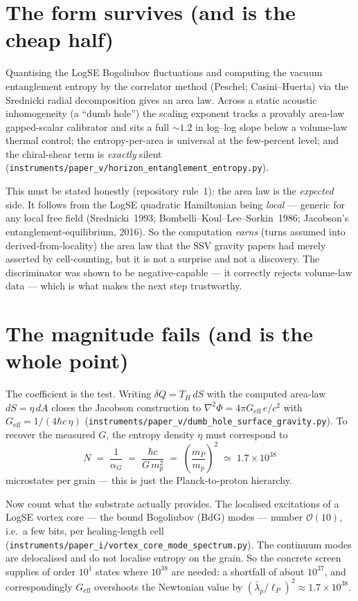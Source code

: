 \documentclass[11pt]{article}
\begin{document}
\section{The form survives (and is the cheap half)}

Quantising the LogSE Bogoliubov fluctuations and computing the vacuum
entanglement entropy by the correlator method (Peschel; Casini--Huerta) via the
Srednicki radial decomposition gives an area law. Across a static acoustic
inhomogeneity (a ``dumb hole'') the scaling exponent tracks a provably area-law
gapped-scalar calibrator and sits a full $\sim\!1.2$ in log--log slope below a
volume-law thermal control; the entropy-per-area is universal at the few-percent
level; and the chiral-shear term is \emph{exactly} silent
(\texttt{instruments/paper\_v/horizon\_entanglement\_entropy.py}).

This must be stated honestly (repository rule~1): the area law is the
\emph{expected} side. It follows from the LogSE quadratic Hamiltonian being
\emph{local} --- generic for any local free field (Srednicki~1993;
Bombelli--Koul--Lee--Sorkin~1986; Jacobson's entanglement-equilibrium, 2016). So
the computation \emph{earns} (turns assumed into derived-from-locality) the area
law that the SSV gravity papers had merely asserted by cell-counting, but it is
not a surprise and not a discovery. The discriminator was shown to be
negative-capable --- it correctly rejects volume-law data --- which is what makes
the next step trustworthy.

\section{The magnitude fails (and is the whole point)}

The coefficient is the test. Writing $\delta Q = T_H\,dS$ with the computed
area-law $dS = \eta\,dA$ closes the Jacobson construction to
$\nabla^2\Phi = 4\pi G_{\mathrm{eff}}\,e/c^2$ with
$G_{\mathrm{eff}} = 1/(4\hbar c\,\eta)$
(\texttt{instruments/paper\_v/dumb\_hole\_surface\_gravity.py}). To recover the
measured $G$, the entropy density $\eta$ must correspond to
\begin{equation}
  N \;=\; \frac{1}{\alpha_G}
        \;=\; \frac{\hbar c}{G\,m_p^2}
        \;=\; \left(\frac{m_P}{m_p}\right)^{2}
        \;\simeq\; 1.7\times 10^{38}
\end{equation}
microstates per grain --- this is just the Planck-to-proton hierarchy.

Now count what the substrate actually provides. The localised excitations of a
LogSE vortex core --- the bound Bogoliubov (BdG) modes --- number
$\mathcal{O}(10)$, i.e.\ a few bits, per healing-length cell
(\texttt{instruments/paper\_i/vortex\_core\_mode\_spectrum.py}). The continuum
modes are delocalised and do not localise entropy on the grain. So the concrete
screen supplies of order $10^{1}$ states where $10^{38}$ are needed: a shortfall
of about $10^{37}$, and correspondingly $G_{\mathrm{eff}}$ overshoots the
Newtonian value by $(\bar{\lambda}_p/\ell_P)^2 \approx 1.7\times10^{38}$.
\end{document}
